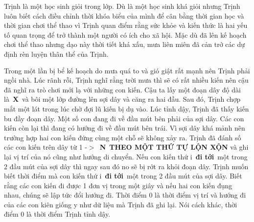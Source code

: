 Trịnh là một học sinh giỏi trong lớp. Dù là một học sinh khá giỏi nhưng Trịnh luôn biết cách điều chỉnh thời khóa biểu của mình để cân bằng thời gian học và thời gian chơi thể thao vì Trịnh quan điểm rằng sức khỏe và kiến thức là hai yếu tố quan trọng để trở thành một người có ích cho xã hội. Mặc dù đã lên kế hoạch chơi thể thao nhưng dạo này thời tiết khá xấu, mưa liên miên đã cản trở các dự định rèn luyện thân thể của Trịnh.

Trong một lần bị bể kế hoạch do mưa quá to và gió giật rất mạnh nên Trịnh phải ngồi nhà. Lúc rãnh rỗi, Trịnh nghĩ rằng trời mưa thì sẽ có rất nhiều kiến nên cậu đã nghĩ ra trò chơi mới lạ với những con kiến. Cậu ta lấy một đoạn dây độ dài là \textbf{X} và bôi một lớp đường lên sợi dây và căng ra hai đầu. Sau đó, Trịnh chợp mắt một lát trong lúc chờ đợi lũ kiến bị dụ vào. Lúc tỉnh dậy, Trịnh đã thấy kiến bu đầy đoạn dây. Một số con đang đi về đầu mút bên phải của sợi dây. Các con kiến còn lại thì đang có hướng đi về đầu mút bên trái. Vì sợi dây khá mảnh nên trường hợp hai con kiến đứng cùng một chỗ sẽ không xảy ra. Trịnh đã đánh số các con kiến trên dây từ 1 -$>$ \textbf{N} \textbf{THEO MỘT THỨ TỰ LỘN XỘN} và ghi lại vị trí của nó cũng như hướng di chuyển. Nếu con kiến thứ i \textbf{đi tới} một trong 2 đầu mút của sợi dây thì ngay sau đó no sẽ bị rớt ra khỏi đoạn dây. Trịnh muốn biết thời điểm mà con kiến thứ i \textbf{đi tới} một trong 2 đầu mút của sợi dây. Biết rằng các con kiến đi được 1 đơn vị trong một giây và nếu hai con kiến đụng nhau, chúng sẽ lập tức đổi hướng đi. Thời điểm 0 là thời điểm vị trí và hướng đi của các con kiên giống y như dữ liệu mà Trịnh đã ghi lại. Nói cách khác, thời điểm 0 là thời điểm Trịnh tỉnh dậy.